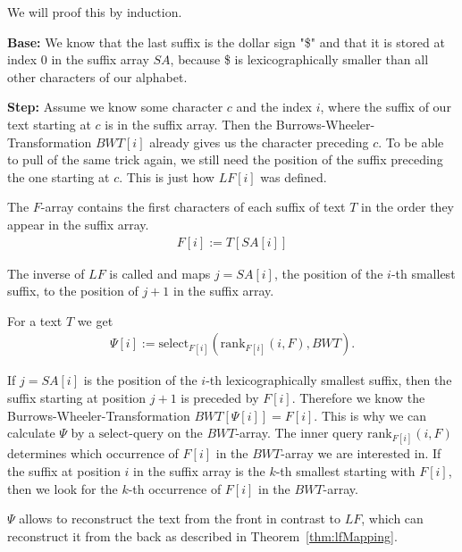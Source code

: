 \begin{Proof}
  We will proof this by induction.

  \textbf{Base:} We know that the last suffix is the dollar sign "\$" and that it is stored at index $0$ in the suffix array $SA$, because \$ is lexicographically smaller than all other characters of our alphabet.

  \textbf{Step:} Assume we know some character $c$ and the index $i$, where the suffix of our text starting at $c$ is in the suffix array. Then the Burrows-Wheeler-Transformation $BWT[i]$ already gives us the character preceding $c$. To be able to pull of the same trick again, we still need the position of the suffix preceding the one starting at $c$. This is just how $LF[i]$ was defined.
\end{Proof}

\begin{Definition}
  The $F$-array contains the first characters of each suffix of text $T$ in the order they appear in the suffix array.
  \begin{align}
    F[i] := T[SA[i]]
  \end{align}
\end{Definition}

\begin{Definition}
  The inverse of $LF$ is called  and maps $j = SA[i]$, the position of the $i$-th smallest suffix, to the position of $j+1$ in the suffix array.
\end{Definition}

\begin{Theorem}
  For a text $T$ we get
  \begin{align}
    \Psi[i] := \mathrm{select}_{F[i]}(\mathrm{rank}_{F[i]}(i, F), BWT)
    \text{.}
  \end{align}
\end{Theorem}

\begin{Proof}
  If $j = SA[i]$ is the position of the $i$-th lexicographically smallest suffix, then the suffix starting at position $j+1$ is preceded by $F[i]$. Therefore we know the Burrows-Wheeler-Transformation $BWT[\Psi[i]] = F[i]$. This is why we can calculate $\Psi$ by a $\mathrm{select}$-query on the $BWT$-array. The inner query $\mathrm{rank}_{F[i]}(i, F)$ determines which occurrence of $F[i]$ in the $BWT$-array we are interested in. If the suffix at position $i$ in the suffix array is the $k$-th smallest starting with $F[i]$, then we look for the $k$-th occurrence of $F[i]$ in the $BWT$-array.
\end{Proof}

$\Psi$ allows to reconstruct the text from the front in contrast to $LF$, which can reconstruct it from the back as described in Theorem~\ref{thm:lfMapping}.
